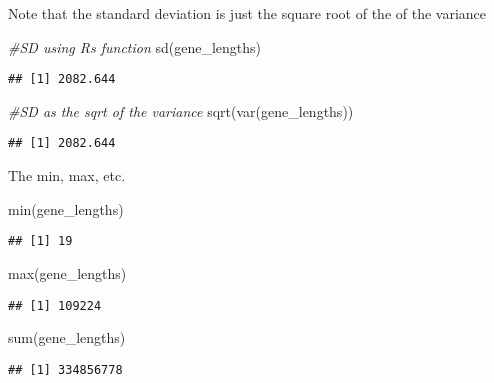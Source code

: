 \documentclass[
]{book}
\newenvironment{Shaded}{\begin{snugshade}}{\end{snugshade}}
\newcommand{\CommentTok}[1]{\textcolor[rgb]{0.56,0.35,0.01}{\textit{#1}}}
\newcommand{\FunctionTok}[1]{\textcolor[rgb]{0.00,0.00,0.00}{#1}}
\newcommand{\NormalTok}[1]{#1}
\begin{document}
Note that the standard deviation is just the square root of the of the variance

\begin{Shaded}
\begin{Highlighting}[]
\CommentTok{\#SD using R\textquotesingle{}s function}
\FunctionTok{sd}\NormalTok{(gene\_lengths)}
\end{Highlighting}
\end{Shaded}

\begin{verbatim}
## [1] 2082.644
\end{verbatim}

\begin{Shaded}
\begin{Highlighting}[]
\CommentTok{\#SD as the sqrt of the variance}
\FunctionTok{sqrt}\NormalTok{(}\FunctionTok{var}\NormalTok{(gene\_lengths))}
\end{Highlighting}
\end{Shaded}

\begin{verbatim}
## [1] 2082.644
\end{verbatim}

The min, max, etc.

\begin{Shaded}
\begin{Highlighting}[]
\FunctionTok{min}\NormalTok{(gene\_lengths)}
\end{Highlighting}
\end{Shaded}

\begin{verbatim}
## [1] 19
\end{verbatim}

\begin{Shaded}
\begin{Highlighting}[]
\FunctionTok{max}\NormalTok{(gene\_lengths)}
\end{Highlighting}
\end{Shaded}

\begin{verbatim}
## [1] 109224
\end{verbatim}

\begin{Shaded}
\begin{Highlighting}[]
\FunctionTok{sum}\NormalTok{(gene\_lengths)}
\end{Highlighting}
\end{Shaded}

\begin{verbatim}
## [1] 334856778
\end{verbatim}
\end{document}

